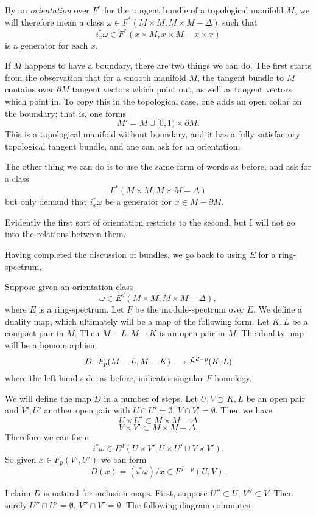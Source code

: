\documentclass[../main]{subfiles}
\begin{document}
By an \emph{orientation} over $F^*$ for the tangent bundle of a topological manifold $M$, we will therefore mean a class $\omega \in F^*(M \times M, M \times M - \Delta)$ such that
\[i_x^* \omega \in F^*(x \times M, x \times M - x \times x)\]
is a generator for each $x$. 

If $M$ happens to have a boundary, there are two things we can do. The first starts from the observation that for a smooth manifold $M$, the tangent bundle to $M$ contains over $\partial M$ tangent vectors which point out, as well as tangent vectors which point in. To copy this in the topological case, one adds an open collar on the boundary; that is, one forms
\[M' = M \cup [0,1) \times \partial M.\]
This is a topological manifold without boundary, and it has a fully satisfactory topological tangent bundle, and one can ask for an orientation.

The other thing we can do is to use the same form of words as before, and ask for a class
\[F^*(M \times M, M \times M - \Delta)\]
but only demand that $i_x^* \omega$ be a generator for $x \in M - \partial M$.

Evidently the first sort of orientation restricts to the second, but I will not go into the relations between them.

Having completed the discussion of bundles, we go back to using $E$ for a ring-spectrum.

Suppose given an orientation class
\[\omega \in E^d(M \times M, M \times M - \Delta),\]
where $E$ is a ring-spectrum. Let $F$ be the module-spectrum over $E$. We define a duality map, which ultimately will be a map of the following form. Let $K,L$ be a compact pair in $M$. Then $M-L,M-K$ is an open pair in $M$. The duality map will be a homomorphism
\[D \colon F_p(M-L,M-K) \longrightarrow \check{F}^{d-p}(K,L)\]
where the left-hand side, as before, indicates singular $F$-homology.

We will define the map $D$ in a number of steps. Let $U,V \supset K,L$ be an open pair and $V',U'$ another open pair with $U \cap U' = \emptyset$, $V \cap V' = \emptyset$. Then we have
\[U \times U' \subset M \times M - \Delta\] 
\[V \times V' \subset M \times M - \Delta.\]
Therefore we can form
\[i^* \omega \in E^d(U \times V', U \times U' \cup V \times V').\]
So given $x \in F_p(V',U')$ we can form
\[D(x) = (i^* \omega)/x \in F^{d-p}(U,V).\]

I claim $D$ is natural for inclusion maps. First, suppose $U'' \subset U$, $V'' \subset V$. Then surely $U'' \cap U' = \emptyset$, $V'' \cap V' = \emptyset$. The following diagram commutes.
\end{document}
